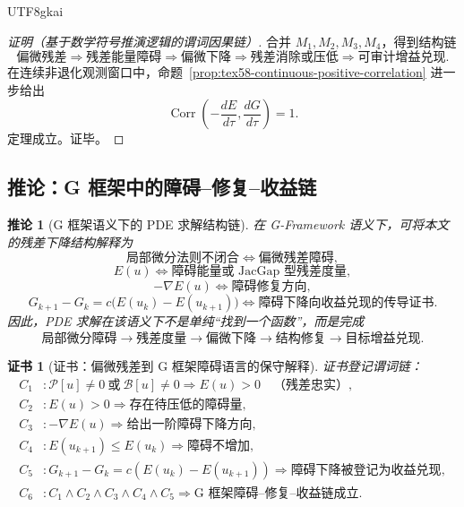 \documentclass[12pt]{article}
\newtheorem{corollary}{推论}[section]
\newtheorem{Certificate}{证书}[section]
\newcommand{\GFramework}{\textsf{G-Framework}}
\newcommand{\Pcal}{\mathcal P}
\newcommand{\Bcal}{\mathcal B}
\DeclareMathOperator{\Corr}{Corr}
\begin{document}
\begin{CJK*}{UTF8}{gkai}
\begin{proof}[证明（基于数学符号推演逻辑的谓词因果链）]
合并 \(M_1,M_2,M_3,M_4\)，得到结构链
\[
  \text{偏微残差}
  \Longrightarrow
  \text{残差能量障碍}
  \Longrightarrow
  \text{偏微下降}
  \Longrightarrow
  \text{残差消除或压低}
  \Longrightarrow
  \text{可审计增益兑现}.
\]
在连续非退化观测窗口中，命题~\ref{prop:tex58-continuous-positive-correlation} 进一步给出
\[
  \Corr\left(
  -\frac{dE}{d\tau},
  \frac{dG}{d\tau}
  \right)=1.
\]
定理成立。证毕。
\end{proof}

\subsection{推论：G 框架中的障碍--修复--收益链}
\label{subsec:tex58-gframework-corollary}

\begin{corollary}[G 框架语义下的 PDE 求解结构链]
\label{cor:tex58-gframework-chain}
在 \GFramework{} 语义下，可将本文的残差下降结构解释为
\[
  \text{局部微分法则不闭合}
  \Longleftrightarrow
  \text{偏微残差障碍},
\]
\[
  E(u)
  \Longleftrightarrow
  \text{障碍能量或 JacGap 型残差度量},
\]
\[
  -\nabla E(u)
  \Longleftrightarrow
  \text{障碍修复方向},
\]
\[
  G_{k+1}-G_k
  =
  c\bigl(E(u_k)-E(u_{k+1})\bigr)
  \Longleftrightarrow
  \text{障碍下降向收益兑现的传导证书}.
\]
因此，PDE 求解在该语义下不是单纯“找到一个函数”，而是完成
\[
  \boxed{
  \text{局部微分障碍}
  \to
  \text{残差度量}
  \to
  \text{偏微下降}
  \to
  \text{结构修复}
  \to
  \text{目标增益兑现}.
  }
\]
\end{corollary}

\begin{Certificate}[证书：偏微残差到 G 框架障碍语言的保守解释]
\label{cert:tex58-gframework-chain}
证书登记谓词链：
\[
\begin{aligned}
  C_1 &: \Pcal[u]\ne0\ \text{或}\ \Bcal[u]\ne0
         \Rightarrow E(u)>0
         \quad\text{（残差忠实）},\\
  C_2 &: E(u)>0\Rightarrow \text{存在待压低的障碍量},\\
  C_3 &: -\nabla E(u)\Rightarrow \text{给出一阶障碍下降方向},\\
  C_4 &: E(u_{k+1})\le E(u_k)\Rightarrow \text{障碍不增加},\\
  C_5 &: G_{k+1}-G_k=c(E(u_k)-E(u_{k+1}))
         \Rightarrow \text{障碍下降被登记为收益兑现},\\
  C_6 &: C_1\wedge C_2\wedge C_3\wedge C_4\wedge C_5
         \Rightarrow \text{G 框架障碍--修复--收益链成立}.
\end{aligned}
\]
\end{Certificate}


\end{CJK*}
\end{document}
